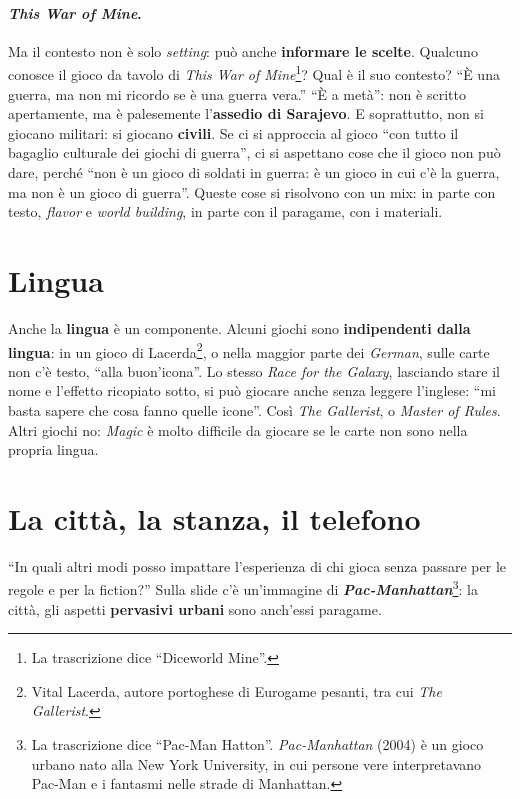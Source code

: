 \paragraph{\emph{This War of Mine}.} Ma il contesto non è solo \emph{setting}: può
anche \textbf{informare le scelte}. Qualcuno conosce il gioco da tavolo di \emph{This War
of Mine}\footnote{La trascrizione dice ``Diceworld Mine''.}? Qual è il suo contesto?
``È una guerra, ma non mi ricordo se è una guerra vera.'' ``È a metà'': non è scritto
apertamente, ma è palesemente l'\textbf{assedio di Sarajevo}. E soprattutto, non si
giocano militari: si giocano \textbf{civili}. Se ci si approccia al gioco ``con tutto il
bagaglio culturale dei giochi di guerra'', ci si aspettano cose che il gioco non può
dare, perché ``non è un gioco di soldati in guerra: è un gioco in cui c'è la guerra, ma
non è un gioco di guerra''. Queste cose si risolvono con un mix: in parte con testo,
\emph{flavor} e \emph{world building}, in parte con il paragame, con i materiali.

\section{Lingua}
\label{a10:sec:lingua}

Anche la \textbf{lingua} è un componente. Alcuni giochi sono \textbf{indipendenti dalla
lingua}: in un gioco di Lacerda\footnote{Vital Lacerda, autore portoghese di Eurogame
pesanti, tra cui \emph{The Gallerist}.}, o nella maggior parte dei \emph{German}, sulle
carte non c'è testo, ``alla buon'icona''. Lo stesso \emph{Race for the Galaxy}, lasciando
stare il nome e l'effetto ricopiato sotto, si può giocare anche senza leggere l'inglese:
``mi basta sapere che cosa fanno quelle icone''. Così \emph{The Gallerist}, o \emph{Master
of Rules}. Altri giochi no: \emph{Magic} è molto difficile da giocare se le carte non sono
nella propria lingua.

\section{La città, la stanza, il telefono}
\label{a10:sec:pervasivo}

``In quali altri modi posso impattare l'esperienza di chi gioca senza passare per le
regole e per la fiction?'' Sulla slide c'è un'immagine di
\textbf{\emph{Pac-Manhattan}}\footnote{La trascrizione dice ``Pac-Man Hatton''.
\emph{Pac-Manhattan} (2004) è un gioco urbano nato alla New York University, in cui
persone vere interpretavano Pac-Man e i fantasmi nelle strade di Manhattan.}: la città,
gli aspetti \textbf{pervasivi urbani} sono anch'essi paragame.

